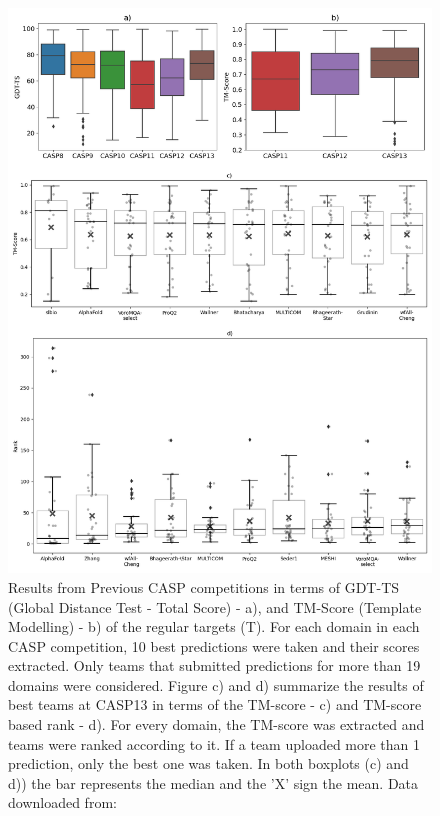 \begin{figure}
    \centering
    \includegraphics[scale=0.47]{imgs_tomas/casp_correct.png}
    \caption{Results from Previous CASP competitions in terms of GDT-TS (Global Distance Test - Total Score) - a), and TM-Score (Template Modelling) - b) of the regular targets (T). For each domain in each CASP competition, 10 best predictions were taken and their scores extracted. Only teams that submitted predictions for more than 19 domains were considered.
    Figure c) and d) summarize the results of best teams at CASP13 in terms of the TM-score - c) and TM-score based rank - d). For every domain, the TM-score was extracted and teams were ranked according to it. If a team uploaded more than 1 prediction, only the best one was taken. In both boxplots (c) and d)) the bar represents the median and the 'X' sign the mean. Data downloaded from: \cite{casp}}
    \label{fig:casp}
\end{figure}

